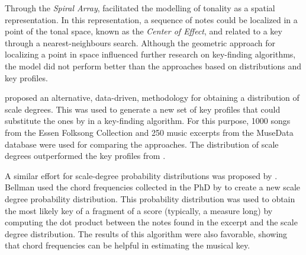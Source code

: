 Through the \emph{Spiral Array}, \textcite{chew2002spiral}
facilitated the modelling of tonality as a spatial
representation. In this representation, a sequence of notes
could be localized in a point of the tonal space, known as
the \emph{Center of Effect}, and related to a key through a
nearest-neighbours search. Although the geometric approach
for localizing a point in space influenced further research
on key-finding algorithms, the model did not perform better
than the approaches based on distributions and key profiles.

\textcite{aarden2003dynamic} proposed an alternative,
data-driven, methodology for obtaining a distribution of
scale degrees. This was used to generate a new set of key
profiles that could substitute the ones by
\textcite{krumhansl1982tracing} in a key-finding algorithm.
For this purpose, 1000 songs from the Essen Folksong
Collection and 250 music excerpts from the MuseData database
were used for comparing the approaches. The distribution of
scale degrees outperformed the key profiles from
\textcite{krumhansl1982tracing}.




A similar effort for scale-degree probability distributions
was proposed by \textcite{bellmann2006about}. Bellman used
the chord frequencies collected in the PhD \thesisdiss{} by
\textcite{budge1943study} to create a new scale degree
probability distribution. This probability distribution was
used to obtain the most likely key of a fragment of a score
(typically, a measure long) by computing the dot product
between the notes found in the excerpt and the scale degree
distribution. The results of this algorithm were also
favorable, showing that chord frequencies can be helpful in
estimating the musical key.



